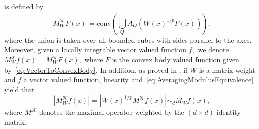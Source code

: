 \documentclass{article}
\theoremstyle{definition}
\theoremstyle{remark}
\numberwithin{equation}{section}
\newcommand{\cK}{\mathcal{K}}
\newcommand{\1}{\mathbf{1}}
\begin{document}
    is defined by
    \begin{equation*}
        M_W^\cK F(x) \coloneq \overline{\mathrm{conv}\left(\bigcup_Q A_Q(W(x)^{1/p}F(x))\right)},
    \end{equation*}
    where the union is taken over all bounded cubes with sides parallel to the axes.
    Moreover, given a locally integrable vector valued function $f,$ we denote $M_W^\cK f(x) = M_W^\cK F(x),$
    where $F$ is the convex body valued function given by~\eqref{eq:VectorToConvexBody}.
    In addition, as proved in \cite[Lemma 3.4]{Vuorinen2024}, if $W$ is a matrix weight and $f$ a vector valued function,
    linearity and~\eqref{eq:AveragingModulusEquivalence} yield that
    \begin{equation}
        \label{eq:MaximalOperatorsEquivalences}
        |M_W^\cK f(x)| = |W(x)^{1/p} M^\cK f(x)| \sim_d M_W f(x),
    \end{equation}
    where $M^\cK$ denotes the maximal operator weighted by the $(d \times d)$-identity matrix.
\end{document}
